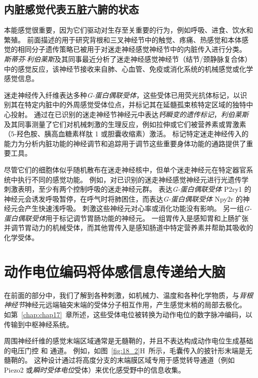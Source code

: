 \subsection{内脏感觉代表五脏六腑的状态}

本能感觉很重要，因为它们驱动对生存至关重要的行为，例如呼吸、进食、饮水和繁殖。
前面描述的用于研究背根和三叉神经节中的触觉、疼痛、热感觉和本体感觉的相同分子遗传策略已被用于对迷走神经感觉神经节中的内脏传入进行分类。
\textit{斯蒂芬$\cdot$利伯莱斯}及其同事最近分析了迷走神经感觉神经节（结节/颈静脉复合体）中的感觉反应，该神经节接收来自肺、心血管、免疫或消化系统的机械感觉或化学感觉信息。


迷走神经传入纤维表达多种\textit{G-蛋白偶联受体}，这些受体已用荧光抗体标记，以识别其在特定内脏中的外周感觉受体位点，并标记其在延髓孤束核特定区域的独特中心投射。
通过在已识别的迷走神经节神经元中表达\textit{钙瞬变的遗传标记}，\textit{利伯莱斯}及其同事测量了它们对机械刺激的生理反应，例如拉伸或它们被营养素或胃激素（5-羟色胺、胰高血糖素样肽 1 或胆囊收缩素）激活。
标记特定迷走神经传入的能力为分析内脏功能的神经调节和追踪用于调节这些重要身体功能的通路提供了重要工具。


尽管它们的细胞体似乎随机散布在迷走神经核中，但单个迷走神经元在特定器官系统中执行不同的感觉功能。
例如，对已识别的迷走神经感觉神经元进行光遗传学刺激表明，至少有两个控制呼吸的迷走神经元群。
表达\textit{G-蛋白偶联受体} P2ry1 的神经元会诱发呼吸暂停，在呼气时将肺困住，而表达\textit{G-蛋白偶联受体} Npy2r 的神经元会产生快速浅呼吸。
刺激这些神经元对心率或消化功能没有影响。
另一组\textit{G-蛋白偶联受体}用于标记调节胃肠功能的神经元。
一组胃传入是感知胃和上肠扩张并调节胃动力的机械受体，而其他胃传入是感知肠道中特定营养素并帮助其吸收的化学受体。



\section{动作电位编码将体感信息传递给大脑}

在前面的部分中，我们了解到各种刺激，如机械力、温度和各种化学物质，与\textit{背根神经节}神经元远端轴突末端的受体分子相互作用，产生感觉末梢的局部去极化。
如第~\ref{chap:chap17}~章所述，这些受体电位被转换为动作电位的数字脉冲编码，以传输到中枢神经系统。


周围神经纤维的感觉末端区域通常是无髓鞘的，并且不表达构成动作电位生成基础的电压门控  和  通道。
例如，如图~\ref{fig:18_2}H~所示，毛囊传入的披针形末端是无髓鞘的。
这种设计通过将高度分支的末端膜区域专用于感觉转导通道（例如 Piezo2 或\textit{瞬时受体电位}受体）来优化感受野中的信息收集。


